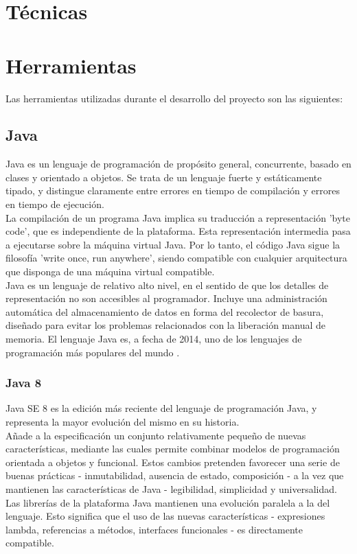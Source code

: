 
\section{Técnicas}

\section{Herramientas}

Las herramientas utilizadas durante el desarrollo del proyecto son las siguientes:

\subsection{Java}

Java es un lenguaje de programación de propósito general, concurrente, basado en clases y orientado a objetos.
Se trata de un lenguaje fuerte y estáticamente tipado, y distingue claramente entre errores en tiempo de compilación y errores en tiempo de ejecución.
\\
La compilación de un programa Java implica su traducción a representación 'byte code', que es independiente de la plataforma.
Esta representación intermedia pasa a ejecutarse sobre la máquina virtual Java.
Por lo tanto, el código Java sigue la filosofía 'write once, run anywhere', siendo compatible con cualquier arquitectura que disponga de una máquina virtual compatible.
\\
Java es un lenguaje de relativo alto nivel, en el sentido de que los detalles de representación no son accesibles al programador.
Incluye una administración automática del almacenamiento de datos en forma del recolector de basura, diseñado para evitar los problemas relacionados con la liberación manual de memoria.
\cite{jls8}
El lenguaje Java es, a fecha de 2014, uno de los lenguajes de programación más populares del mundo \cite{website:tiobe}.

\subsubsection{Java 8}

Java SE 8 es la edición más reciente del lenguaje de programación Java, y representa la mayor evolución del mismo en su historia.
\\
Añade a la especificación un conjunto relativamente pequeño de nuevas características, mediante las cuales permite combinar modelos de programación orientada a objetos y funcional.
Estos cambios pretenden favorecer una serie de buenas prácticas - inmutabilidad, ausencia de estado, composición - a la vez que mantienen las características de Java - legibilidad, simplicidad y universalidad.
\\
Las librerías de la plataforma Java mantienen una evolución paralela a la del lenguaje.
Esto significa que el uso de las nuevas características - expresiones lambda, referencias a métodos, interfaces funcionales - es directamente compatible.
\cite{jls8}

